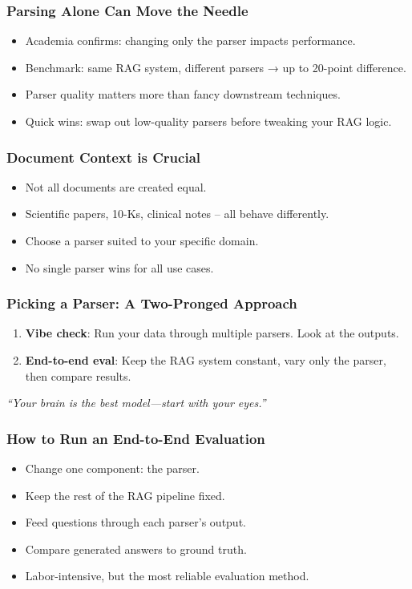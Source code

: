 \begin{frame}[fragile]\frametitle{Parsing Alone Can Move the Needle}
  \begin{itemize}
    \item Academia confirms: changing only the parser impacts performance.
    \item Benchmark: same RAG system, different parsers → up to 20-point difference.
    \item Parser quality matters more than fancy downstream techniques.
    \item Quick wins: swap out low-quality parsers before tweaking your RAG logic.
  \end{itemize}
\end{frame}

\begin{frame}[fragile]\frametitle{Document Context is Crucial}
  \begin{itemize}
    \item Not all documents are created equal.
    \item Scientific papers, 10-Ks, clinical notes – all behave differently.
    \item Choose a parser suited to your specific domain.
    \item No single parser wins for all use cases.
  \end{itemize}
\end{frame}

\begin{frame}[fragile]\frametitle{Picking a Parser: A Two-Pronged Approach}
  \begin{enumerate}
    \item \textbf{Vibe check}: Run your data through multiple parsers. Look at the outputs.
    \item \textbf{End-to-end eval}: Keep the RAG system constant, vary only the parser, then compare results.
  \end{enumerate}
  \vspace{1em}
  \textit{“Your brain is the best model—start with your eyes.”}
\end{frame}

\begin{frame}[fragile]\frametitle{How to Run an End-to-End Evaluation}
  \begin{itemize}
    \item Change one component: the parser.
    \item Keep the rest of the RAG pipeline fixed.
    \item Feed questions through each parser’s output.
    \item Compare generated answers to ground truth.
    \item Labor-intensive, but the most reliable evaluation method.
  \end{itemize}
\end{frame}

